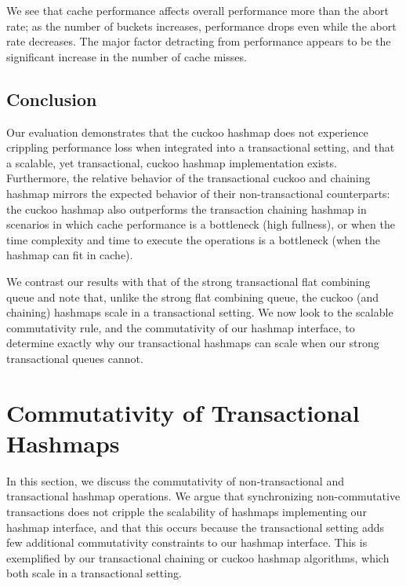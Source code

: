 We see that cache performance affects overall performance more than the abort rate; as the number of buckets increases, performance drops even while the abort rate decreases. The major factor detracting from performance appears to be the significant increase in the number of cache misses.

\vspace{12pt}
\noindent{}

\subsection{Conclusion}

Our evaluation demonstrates that the cuckoo hashmap does not experience crippling performance loss when integrated into a transactional setting, and that a scalable, yet transactional, cuckoo hashmap implementation exists. Furthermore, the relative behavior of the transactional cuckoo and chaining hashmap mirrors the expected behavior of their non-transactional counterparts: the cuckoo hashmap also outperforms the transaction chaining hashmap in scenarios in which cache performance is a bottleneck (high fullness), or when the time complexity and time to execute the operations is a bottleneck (when the hashmap can fit in cache). 

We contrast our results with that of the strong transactional flat combining queue and note that, unlike the strong flat combining queue, the cuckoo (and chaining) hashmaps scale in a transactional setting. We now look to the scalable commutativity rule, and the commutativity of our hashmap interface, to determine exactly why our transactional hashmaps can scale when our strong transactional queues cannot. 

\section{Commutativity of Transactional Hashmaps}
\label{hm_deps}

In this section, we discuss the commutativity of non-transactional and transactional hashmap operations. We argue that synchronizing non-commutative transactions does not cripple the scalability of hashmaps implementing our hashmap interface, and that this occurs because the transactional setting adds few additional commutativity constraints to our hashmap interface. This is exemplified by our transactional chaining or cuckoo hashmap algorithms, which both scale in a transactional setting. 

